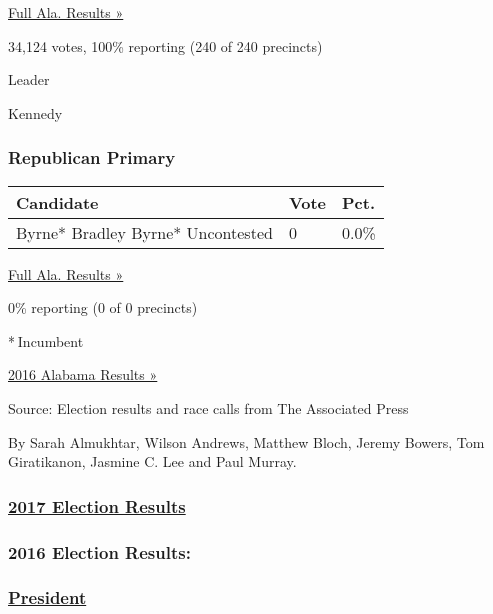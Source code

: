 \href{https://www.nytimes3xbfgragh.onion/elections/results/alabama}{Full
Ala. Results »}

34,124 votes, 100\% reporting (240 of 240 precincts)

Leader

 Kennedy

\hypertarget{republican-primary}{%
\subsubsection{Republican Primary}\label{republican-primary}}

\begin{longtable}[]{@{}lll@{}}
\toprule
Candidate & Vote & Pct.\tabularnewline
\midrule
\endhead
 Byrne* Bradley Byrne* Uncontested & 0 & 0.0\%\tabularnewline
\bottomrule
\end{longtable}

\href{https://www.nytimes3xbfgragh.onion/elections/results/alabama}{Full
Ala. Results »}

0\% reporting (0 of 0 precincts)

* Incumbent

\href{https://www.nytimes3xbfgragh.onion/elections/results/alabama}{2016
Alabama Results »}

Source: Election results and race calls from The Associated Press

By Sarah Almukhtar, Wilson Andrews, Matthew Bloch, Jeremy Bowers, Tom
Giratikanon, Jasmine C. Lee and Paul Murray.

\hypertarget{2017-election-results}{%
\subsubsection{\texorpdfstring{\href{https://www.nytimes3xbfgragh.onion/interactive/2017/us/elections/election-calendar.html}{2017
Election Results}}{2017 Election Results}}\label{2017-election-results}}

\hypertarget{2016-election-results}{%
\subsubsection{2016 Election Results:}\label{2016-election-results}}

\hypertarget{president}{%
\subsubsection{\texorpdfstring{\href{https://www.nytimes3xbfgragh.onion/elections/results/president}{President}}{President}}\label{president}}

